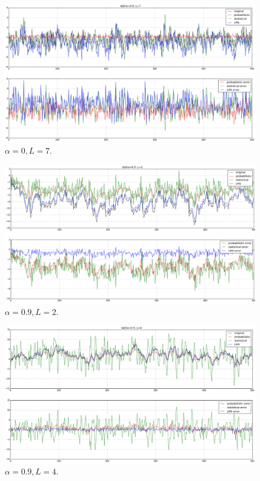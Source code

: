 \begin{enumerate}[(a)]
\begin{figure}[htbp]
	\centering
	\includegraphics[width=\textwidth]{images/p5-3}
	\caption{$\alpha=0, L=7$.}
	\label{fig:p5-3}
\end{figure}

\begin{figure}[htbp]
	\centering
	\includegraphics[width=\textwidth]{images/p5-4}
	\caption{$\alpha=0.9, L=2$.}
	\label{fig:p5-4}
\end{figure}

\begin{figure}[htbp]
	\centering
	\includegraphics[width=\textwidth]{images/p5-5}
	\caption{$\alpha=0.9, L=4$.}
	\label{fig:p5-5}
\end{figure}


\end{enumerate}
